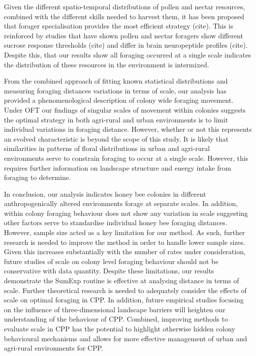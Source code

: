 \documentclass[11pt,usenames,dvipsnames]{article}
\begin{document}
Given the different spatio-temporal distributions of pollen and nectar resources, combined with the different skills needed to harvest them, it has been proposed that forager specialisation provides the most efficient strategy (cite). This is reinforced by studies that have shown pollen and nectar foragers show different sucrose response thresholds (cite) and differ in brain neuropeptide profiles (cite). Despite this, that our results show all foraging occurred at a single scale indicates the distribution of these resources in the environment is intermixed. 

From the combined approach of fitting known statistical distributions and measuring foraging distances variations in terms of scale, our analysis has provided a phenomenological description of colony wide foraging movement. Under OFT our findings of singular scales of movement within colonies suggests the optimal strategy in both agri-rural and urban environments is to limit individual variations in foraging distance. However, whether or not this represents an evolved characteristic is beyond the scope of this study. It is likely that similarities in patterns of floral distributions in urban and agri-rural environments serve to constrain foraging to occur at a single scale. However, this requires further information on landscape structure and energy intake from foraging to determine. 

In conclusion, our analysis indicates honey bee colonies in different anthropogenically altered environments forage at separate scales. In addition, within colony foraging behaviour does not show any variation in scale suggesting other factors serve to standardise individual honey bee foraging distances. However, sample size acted as a key limitation for our method. As such, further research is needed to improve the method in order to handle lower sample sizes. Given this increases substantially with the number of rates under consideration, future studies of scale on colony level foraging behaviour should not be conservative with data quantity. Despite these limitations, our results demonstrate the SumExp routine is effective at analysing distance in terms of scale. Further theoretical research is needed to adequately consider the effects of scale on optimal foraging in CPP. In addition, future empirical studies focusing on the influence of three-dimensional landscape barriers will heighten our understanding of the behaviour of CPP. Combined, improving methods to evaluate scale in CPP has the potential to highlight otherwise hidden colony behavioural mechanisms and allows for more effective management of urban and agri-rural environments for CPP. 




\end{document}
